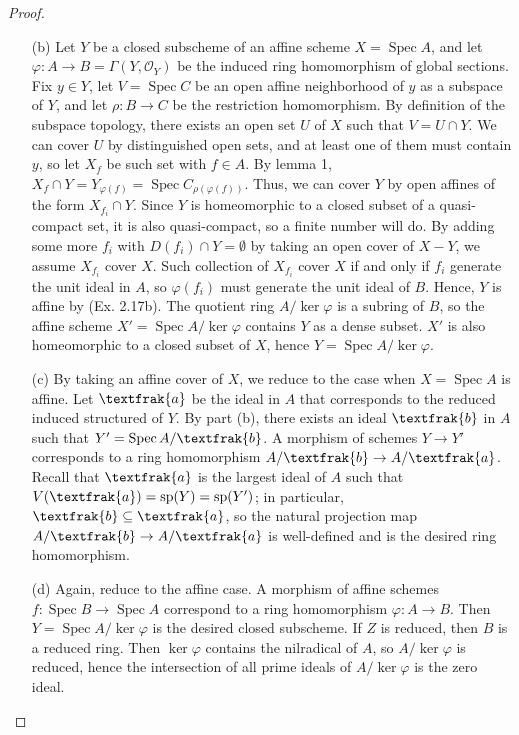 \documentclass{article}
\newcommand{\goth}[1]{\textfrak{#1}}
\newcommand{\OO}{\mathscr{O}}
\DeclareMathOperator{\spec}{Spec}
\begin{document}
\begin{enumerate} [label=\textbf{\arabic*.}, leftmargin=0em]
\begin{proof}
\begin{itemize} [leftmargin=0cm]
    \item[(b)] Let $Y$ be a closed subscheme of an affine scheme $X = \spec{A}$, and let $\varphi : A \to B = \Gamma(Y, \OO_Y)$ be the induced ring homomorphism of global sections. Fix $y \in Y$, let $V = \spec{C}$ be an open affine neighborhood of $y$ as a subspace of $Y$, and let $\rho : B \to C$ be the restriction homomorphism. By definition of the subspace topology, there exists an open set $U$ of $X$ such that $V = U \cap Y$. We can cover $U$ by distinguished open sets, and at least one of them must contain $y$, so let $X_f$ be such set with $f \in A$. By lemma 1, $X_f \cap Y = Y_{\varphi(f)} = \spec{C_{\rho(\varphi(f))}}$. Thus, we can cover $Y$ by open affines of the form $X_{f_i} \cap Y$. Since $Y$ is homeomorphic to a closed subset of a quasi-compact set, it is also quasi-compact, so a finite number will do. By adding some more $f_i$ with $D(f_i) \cap Y = \emptyset$ by taking an open cover of $X - Y$, we assume $X_{f_i}$ cover $X$. Such collection of $X_{f_i}$ cover $X$ if and only if $f_i$ generate the unit ideal in $A$, so $\varphi(f_i)$ must generate the unit ideal of $B$. Hence, $Y$ is affine by (Ex. 2.17b). The quotient ring $A / \ker{\varphi}$ is a subring of $B$, so the affine scheme $X' = \spec{A / \ker{\varphi}}$ contains $Y$ as a dense subset. $X'$ is also homeomorphic to a closed subset of $X$, hence $Y = \spec{A / \ker{\varphi}}$.

    \item[(c)] By taking an affine cover of $X$, we reduce to the case when $X = \spec{A}$ is affine. Let $\goth{a}$ be the ideal in $A$ that corresponds to the reduced induced structured of $Y$. By part (b), there exists an ideal $\goth{b}$ in $A$ such that $Y' = \spec{A / \goth{b}}$. A morphism of schemes $Y \to Y'$ corresponds to a ring homomorphism $A / \goth{b} \to A / \goth{a}$. Recall that $\goth{a}$ is the largest ideal of $A$ such that $V(\goth{a}) = \text{sp}(Y) = \text{sp}(Y')$; in particular, $\goth{b} \subseteq \goth{a}$, so the natural projection map $A / \goth{b} \to A / \goth{a}$ is well-defined and is the desired ring homomorphism.

    \item[(d)] Again, reduce to the affine case. A morphism of affine schemes $f : \spec{B} \to \spec{A}$ correspond to a ring homomorphism $\varphi : A \to B$. Then $Y = \spec{A / \ker{\varphi}}$ is the desired closed subscheme. If $Z$ is reduced, then $B$ is a reduced ring. Then $\ker{\varphi}$ contains the nilradical of $A$, so $A / \ker{\varphi}$ is reduced, hence the intersection of all prime ideals of $A / \ker{\varphi}$ is the zero ideal.
   \end{itemize} 
\end{proof}


\end{enumerate}
\end{document}
